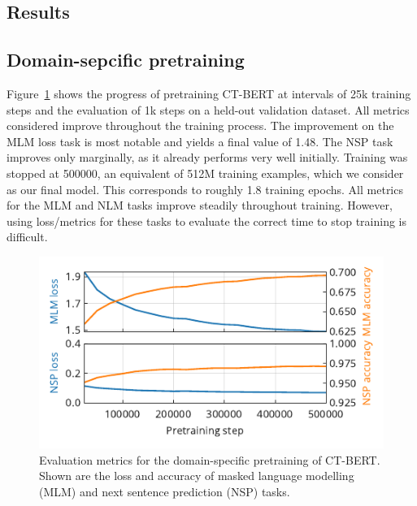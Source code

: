 \documentclass{article}
\begin{document}
\begin{multicols}{2}

\section{Results}
\label{sec:results}

\subsection{Domain-sepcific pretraining}
\label{sec:domain_specific_pretraining}
Figure~\ref{fig:fig1} shows the progress of pretraining \textsc{CT-BERT} at intervals of 25k training steps and the evaluation of 1k steps on a held-out validation dataset.
All metrics considered improve throughout the training process.
The improvement on the MLM loss task is most notable and yields a final value of 1.48.
The NSP task improves only marginally, as it already performs very well initially.
Training was stopped at \num{500000}, an equivalent of \num{512}M training examples, which we consider as our final model.
This corresponds to roughly 1.8 training epochs.
All metrics for the MLM and NLM tasks improve steadily throughout training.
However, using loss/metrics for these tasks to evaluate the correct time to stop training is difficult.

\end{multicols}
\begin{figure}
  \centering
  \includegraphics[]{fig1.pdf}
  \caption{
    Evaluation metrics for the domain-specific pretraining of \textsc{CT-BERT}.
    Shown are the loss and accuracy of masked language modelling (MLM) and next sentence prediction (NSP) tasks.
  }
  \label{fig:fig1}
\end{figure}
\end{document}

